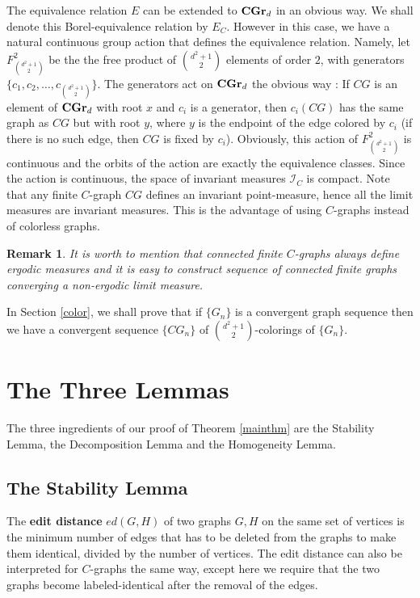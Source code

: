 \documentclass{article}
\newtheorem{remark}{Remark}[section]
\newcommand{\ad}{d^2+1 \choose 2}
\newcommand{\CGrd}[1][d]{\textrm{\textbf{CGr}}_{#1}}
\newcommand{\I}{\mathcal{I}}
\begin{document}
The equivalence relation $E$ can be extended to $\CGrd$ in an obvious way.
We shall denote this Borel-equivalence relation by $E_C$.
However in this case, we have a natural continuous group action that
defines the equivalence relation. Namely, let $F^2_{\ad}$ be the the free
product of $\ad$ elements of order $2$, with generators
$\{c_1,c_2,\dots,c_{\ad}\}$. The generators act on $\CGrd$ the obvious way :
If $CG$ is an element of $\CGrd$ with root $x$ and $c_i$ is a generator,
then $c_i(CG)$ has the same graph as $CG$ but with root $y$, where $y$ is
the endpoint of the edge colored by $c_i$ (if there is no such edge, then
$CG$ is fixed by $c_i$). Obviously, this action of $F^2_{\ad}$ is
continuous and the orbits of the action are exactly the equivalence
classes. Since the action is continuous, the space of invariant measures
$\I_C$ is compact. Note that any finite $C$-graph $CG$ defines an invariant
point-measure, hence all the limit measures are invariant measures.
This is the advantage of using $C$-graphs instead of colorless graphs.
\begin{remark}
It is worth to mention that connected finite $C$-graphs always
define ergodic measures
and it is easy to construct sequence of connected finite graphs
converging a non-ergodic limit measure. 
\end{remark}

\noindent 
In Section \ref{color}, we shall prove that if $\{G_n\}$ is
a convergent graph sequence then we have a convergent sequence $\{CG_n\}$
of $\ad$-colorings of $\{G_n\}$.



\section{The Three Lemmas}
The three ingredients of our proof of Theorem \ref{mainthm}
are 
the Stability Lemma, the Decomposition Lemma and the
Homogeneity Lemma.
\subsection{The Stability Lemma}
The {\bf edit distance} $ed(G,H)$ of two graphs $G,H$ on the
  same set of vertices is the minimum number of edges that has to be
  deleted from the graphs to make them identical, divided by the
  number of vertices. The edit distance can also be interpreted for
  $C$-graphs the same way, except here we require that the two graphs
  become labeled-identical after the removal of the edges.
\end{document}
